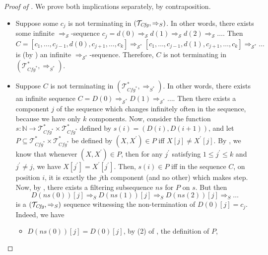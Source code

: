 \begin{proof}[Proof of ]
We prove both implications separately, by contraposition.
\begin{itemize}
    \item Suppose some $c_j$ is not terminating in $(\mathcal{T}_{\mathit{Cfg}}, \Rightarrow_S)$.
    In other words, there exists some infinite $\Rightarrow_{\mathcal{S}}$-sequence
    $c_j = d(0) \Rightarrow_{\mathcal{S}} d(1) \Rightarrow_{\mathcal{S}} d(2) \Rightarrow_{\mathcal{S}} \ldots$.
    Then $C = [c_1,\ldots,c_{j-1}, d(0), c_{j+1}, \ldots, c_k] \Rightarrow_{\mathcal{S}^*}
    [c_1,\ldots,c_{j-1}, d(1), c_{j+1}, \ldots, c_k] \Rightarrow_{\mathcal{S}^*} \ldots$
    is (by ) an infinite $\Rightarrow_{\mathcal{S}^*}$-sequence.
    Therefore, $C$ is not terminating in $(\mathcal{T}^*_{\mathit{Cfg}^*}, \Rightarrow_{S^*})$.
    \item Suppose $C$ is not terminating in $(\mathcal{T}^*_{\mathit{Cfg}^*}, \Rightarrow_{S^*})$.
    In other words, there exists an infinite sequence $C = D(0) \Rightarrow_{\mathcal{S}^*} D(1) \Rightarrow_{\mathcal{S}^*} \ldots$.
    Then there exists a component $j$ of the sequence which changes infinitely often in the sequence,
    because we have only $k$ components.
    Now, consider the function $s : \mathbb{N} \to \mathcal{T}^*_{\mathit{Cfg}^*} \times \mathcal{T}^*_{\mathit{Cfg}^*}$
    defined by $s(i) = (D(i), D(i+1))$, and let $P \subseteq \mathcal{T}^*_{\mathit{Cfg}^*} \times \mathcal{T}^*_{\mathit{Cfg}^*}$
    be defined by $(X, X^\prime) \in P$ iff $X[j] \not = X^\prime[j]$.
    By , we know that whenever $(X, X^\prime) \in P$,
    then for any $j^\prime$ satisfying $1 \leq j^\prime \leq k$ and $j^\prime \not = j$,
    we have $X[j^\prime] = X^\prime[j^\prime]$.
    Then, $s(i) \in P$ iff in the sequence $C$, on position $i$, it is exactly the $j$th component (and no other)
    which makes step.
    Now, by , there exists a filtering subsequence $\mathit{ns}$
    for $P$ on $s$.
    But then
    \begin{equation*}
        D(\mathit{ns}(0))[j] \Rightarrow_S D(\mathit{ns}(1))[j] \Rightarrow_S D(\mathit{ns}(2))[j] \Rightarrow_S \ldots
    \end{equation*}
    is a $(\mathcal{T}_{\mathit{Cfg}}, \Rightarrow_S)$ sequence witnessing the non-termination of $D(0)[j] = c_j$.
    Indeed, we have
    \begin{itemize}
        \item $D(\mathit{ns}(0))[j] = D(0)[j]$, by (2) of , the definition of $P$,

\end{itemize}
\end{itemize}
\end{proof}
